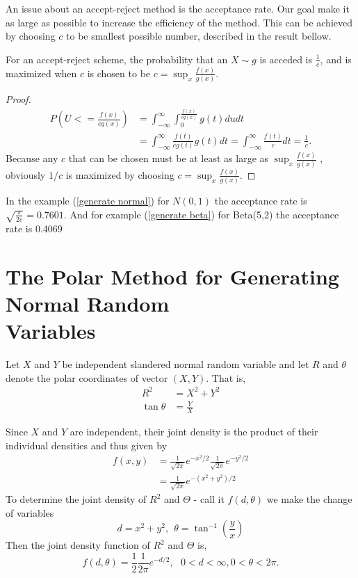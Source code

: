 An issue about an accept-reject method is the acceptance rate.
Our goal make it as large as possible to increase the efficiency of the method.
This can be achieved by choosing $c$ to be smallest possible number, described in the result bellow.
\begin{theorem}
	For an accept-reject scheme, the probability that an $X\sim g$ is acceded is  $\frac{1}{c}$,
	and is maximized when $c$ is chosen to be $c=\sup_x\frac{f(x)}{g(x)}.$
\end{theorem}
\begin{proof}
	\begin{align*}
		P\left( U<=\frac{f(x)}{cg(x)} \right) & = \int_{-\infty}^{\infty} \int_{0}^{\frac{f(x)}{cg(x)}} g(t) du dt                                           \\
		                                      & = \int_{-\infty}^{\infty} \frac{f(t)}{cg(t)}g(t)dt = \int_{-\infty}^{\infty} \frac{f(t)}{c}dt = \frac{1}{c}.
	\end{align*}
	Because any $c$ that can be chosen must be at least as large as $\sup_x\frac{f(x)}{g(x)}$
	, obviously $1/c$ is maximized by choosing $c=\sup_x\frac{f(x)}{g(x)}.$
\end{proof}

In the example (\ref{generate normal}) for $N(0,1)$ the acceptance rate is $\sqrt{\frac{\pi}{2 e}} = 0.7601$.
And for example (\ref{generate beta}) for Beta(5,2) the acceptance rate is 0.4069

\section{The Polar Method for Generating Normal Random \\ Variables}

Let $X$ and $Y$ be independent slandered normal random variable and let $R$ and $\theta$
denote the polar coordinates of vector $(X,Y)$. That is,
\begin{align*}
	R^{2}       & = X^{2} + Y^2 \\
	\tan \theta & = \frac{Y}{X}
\end{align*}

Since $X$ and $Y$ are independent, their joint density is the product of their individual densities and thus given by
\begin{align*}
	f(x,y) & = \frac{1}{\sqrt{2\pi}} e^{-x^{2}/2 } \frac{1}{\sqrt{2\pi}} e^{-y^{2}/2 } \\
	       & = \frac{1}{\sqrt{2\pi}} e^{-(x^{2}+y^{2})/2}
\end{align*}
To determine the joint density of $R^{2} $ and $\Theta$ - call it $f(d,\theta)$ we make the change of variables
\[
	d=x^{2}+y^{2}, \ \  \theta=\tan^{-1}\left( \frac{y}{x} \right)
\]
Then the joint density function of $R^{2} $ and $\Theta$ is,
\begin{equation}
	f(d,\theta) = \frac{1}{2}\frac{1}{2\pi} e^{-d/2},\ \ \ 0< d<\infty, 0<\theta<2 \pi.
\end{equation}


